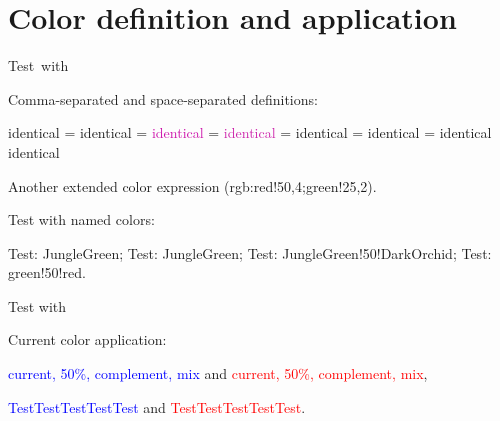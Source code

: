 \documentclass[a4paper]{article}
\begin{document}
\clearpage
\pagecolor{white}

\section{Color definition and application}

\hbox{\textcolor{dummy}{Test with \texttt{\string\definecolor}}}

\bigskip

Comma-separated and space-separated definitions:


\textcolor{c1}{identical} =
\textcolor{c2}{identical} =
\textcolor{c1a}{identical} =
\textcolor{c2a}{identical} =
\textcolor[rgb]{.7,.6,.5}{identical} =
\textcolor[rgb]{.7 .6 .5}{identical} =
\textcolor{rgb,10:red,7;green,6;blue,5}{identical}
\textcolor{rgb,15:red,10.5;green,9;blue,7.5}{identical}

\medskip

\begingroup
\sffamily
\begin{testcolors}
\end{testcolors}
\endgroup

\bigskip

\textcolor{rgb:red!50,4;green!25,2}{Another extended color expression (rgb:red!50,4;green!25,2)}.

\bigskip

\begingroup
\color{black}
Test with named colors:\par
\color{blue}
Test: \textcolor[named]{JungleGreen}{JungleGreen};
Test: \textcolor{JungleGreen}{JungleGreen};
Test: \textcolor{JungleGreen!50!DarkOrchid}{JungleGreen!50!DarkOrchid};
Test: \textcolor{green!50!red}{green!50!red}.
\endgroup

\bigskip

{\color[rgb]{.4,.5,.6}Test with \texttt{\string\color}}

\bigskip
Current color application:\par
\def\test{current, \textcolor{.!50}{50\%}, \textcolor{-.}{complement},
          \textcolor{yellow!50!.}{mix}}
\textcolor{blue}{\test} and \textcolor{red}{\test},\par
\def\Test{\color{.!80}Test}
\textcolor{blue}{\Test\Test\Test\Test\Test} and
\textcolor{red}{\Test\Test\Test\Test\Test}.
\end{document}
